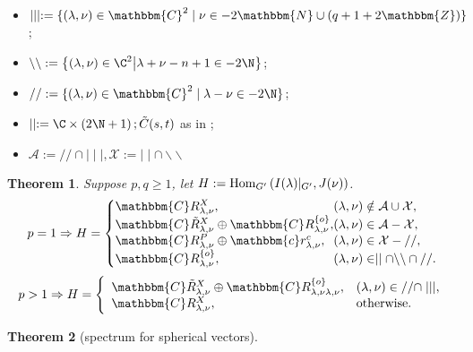 \documentclass[portrait,final,paperwidth=90cm,paperheight=120cm,fontscale=0.3]{baposter}
\newcommand{\assign}{:=}
\newcommand{\tmop}[1]{\ensuremath{\operatorname{#1}}}
\newtheorem{theorem}{Theorem}
\newcommand{\Hom}{\mbox{\normalfont Hom}}
\newtheorem{corollary}[theorem]{Corollary}
\theoremstyle{definition}
\newcommand{\IlambdaGprime}{I(\lambda)\kern-0.3em\mid_{G'}}
\newcommand{\SBO}{\Hom_{G'}\left(\IlambdaGprime,J(\nu) \right)}
\newcommand{\mm}{\mid\mid}
\newcommand{\bb}{\backslash\backslash}
\renewcommand{\ss}{//}
\begin{document}
\begin{poster}
 {
\begin{itemize}
	\item $\mid \mid \mid \assign \{ (\lambda, \nu) \in \mathbbm{C}^2 \mid \nu \in
	- 2\mathbbm{N} \cup (q + 1 + 2\mathbbm{Z}) \}$;
	\item $\backslash\backslash:=\mysetn{(\lambda,\nu)\in\C^2}{\lambda+\nu-n+1\in-2\N}$;
	\item $/ / \assign
	\{ (\lambda, \nu) \in \mathbbm{C}^2 \mid \lambda - \nu \in
	-2\N \}$;
	\item$ \mid\mid:=\C\times\left( 2\N+1 \right);\tilde{C}(s,t)$ as in \cite[(16.3)]{kobayashi2015symmetry};
	\item $\mathcal{A}:=\ss\cap\mid\mid\mid, \mathcal{X}:=\mm\cap\bb$
	\end{itemize}
 }
{
\begin{theorem}\label{thm:classif}
	Suppose $p,q\ge1$, let $H:=\SBO$.
\[ p = 1 \Rightarrow H = \left\{
	\begin{array}{@{}l@{}l@{}}
		\mathbbm{C}R^X_{\lambda, \nu}, & (\lambda, \nu) \notin  \mathcal{A}\cup \mathcal{X}
     ,\\
     \mathbbm{C} \tilde{R}^X_{\lambda, \nu} \oplus \mathbbm{C}R^{\{ o
     \}}_{\lambda, \nu}, & (\lambda, \nu) \in \mathcal{A} -
     \mathcal{X},\\
     \mathbbm{C}R^P_{\lambda, \nu} \oplus \mathbbm{c}r^c_{\lambda, \nu}, &
     (\lambda, \nu) \in \mathcal{X} - / /,\\
     \mathbbm{C}R^{\{ o \}}_{\lambda, \nu}, & (\lambda, \nu) \in \mid \mid
     \cap \backslash\backslash \cap / /.
   \end{array} \right. \]
\[ p > 1 \Rightarrow H = \left\{
   \begin{array}{ll}
     \mathbbm{C} \tilde{R}^X_{\lambda, \nu} \oplus \mathbbm{C}R^{\{ o
     \}}_{\lambda, \nu \lambda, \nu}, & (\lambda, \nu) \in / / \cap \mid \mid
     \mid,\\
     \mathbbm{C}R^X_{\lambda, \nu}, & \tmop{otherwise.}
   \end{array} \right. \]
\end{theorem}
}
{
\begin{theorem}[spectrum for spherical vectors]\label{thm:spherical}

\end{theorem}}
\end{poster}
\end{document}
